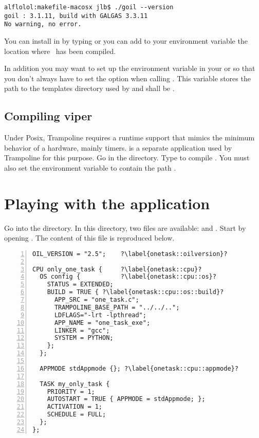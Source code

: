\begin{verbatim}
alflolol:makefile-macosx jlb$ ./goil --version
goil : 3.1.11, build with GALGAS 3.3.11
No warning, no error.
\end{verbatim}

You can install  in  by typing  or you can add to your  environment variable the location where \goil\ has been compiled.

In addition you may want to set up the  environment variable in your  or  so that you don't always have to set the  option when calling . This variable stores the path to the templates directory used by  and shall be .

\subsection{Compiling viper}

Under Posix, Trampoline requires a runtime support that mimics the minimum behavior of a hardware, mainly timers.  is a separate application used by Trampoline for this purpose. Go in the  directory. Type  to compile . You must also set the environment variable  to contain the path .

\section{Playing with the  application}

Go into the  directory. In this directory, two files are available:  and . Start by opening . The content of this file is reproduced below. 

\begin{lstlisting}[language=OIL,numbers=left,escapechar=?]
OIL_VERSION = "2.5"; 	?\label{onetask::oilversion}?

CPU only_one_task {  	?\label{onetask::cpu}?
  OS config {			?\label{onetask::cpu::os}?
    STATUS = EXTENDED;
    BUILD = TRUE { ?\label{onetask::cpu::os::build}?
      APP_SRC = "one_task.c";
      TRAMPOLINE_BASE_PATH = "../../..";
      LDFLAGS="-lrt -lpthread";
      APP_NAME = "one_task_exe";
      LINKER = "gcc";
      SYSTEM = PYTHON;
    };
  };
  
  APPMODE stdAppmode {}; ?\label{onetask::cpu::appmode}?
  
  TASK my_only_task {
    PRIORITY = 1;
    AUTOSTART = TRUE { APPMODE = stdAppmode; };
    ACTIVATION = 1;
    SCHEDULE = FULL;
  };
};
\end{lstlisting}

